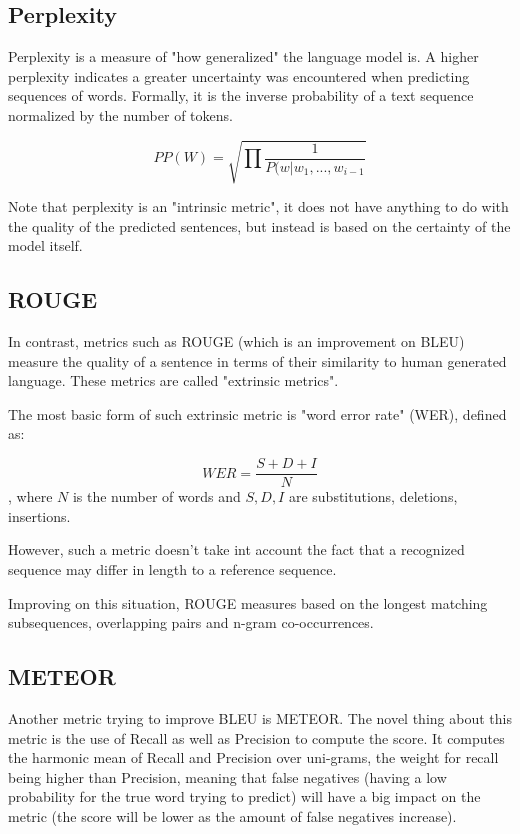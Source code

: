 \documentclass[a4paper]{article}
\begin{document}
\subsection{Perplexity}
\label{sec:perplexity}

Perplexity is a measure of "how generalized" the language
model is. A higher perplexity indicates a greater uncertainty
was encountered when predicting sequences of words. Formally,
it is the inverse probability of a text sequence normalized
by the number of tokens.

$$ PP(W) = \sqrt{\prod \frac{1}{P(w|w_1, ..., w_{i - 1}}} $$

Note that perplexity is an "intrinsic metric", it does not
have anything to do with the quality of the predicted
sentences, but instead is based on the certainty of the
model itself.

\subsection{ROUGE}
\label{sec:rouge}

In contrast, metrics such as ROUGE (which is an improvement
on BLEU) measure the quality of a sentence in terms of
their similarity to human generated language. These metrics
are called "extrinsic metrics".

The most basic form of such extrinsic metric is "word error
rate" (WER), defined as:

$$ WER = \frac{S + D + I}{N} $$, where $N$ is the number of
words and $S, D, I$ are substitutions, deletions, insertions.

However, such a metric doesn't take int account the fact that
a recognized sequence may differ in length to a reference
sequence.

Improving on this situation, ROUGE measures based on the
longest matching subsequences, overlapping pairs and n-gram
co-occurrences.

\subsection{METEOR}
\label{sec:meteor}
Another metric trying to improve BLEU is
METEOR. The novel thing about this metric is the use of Recall as well as
Precision to compute the score. It computes the harmonic mean of Recall and
Precision over uni-grams, the weight for recall being higher than Precision,
meaning that false negatives (having a low probability for the true word trying
to predict) will have a big impact on the metric (the score will be lower as the
amount of false negatives increase).
\end{document}
